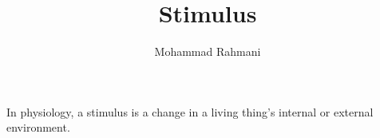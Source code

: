 \documentclass[a4paper]{article}
\title{Stimulus}
\date{}
\author{Mohammad Rahmani}
\begin{document}
   \maketitle

   In physiology, a stimulus is a change in a living thing's internal or external environment.
   
   
   
\end{document}
